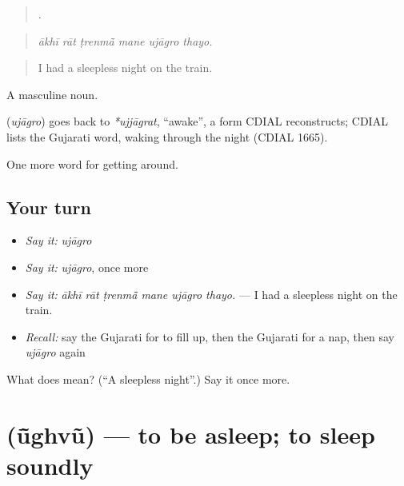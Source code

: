 \begin{quote}
     .
\end{quote}

\begin{quote}
\emph{ākhī rāt ṭrenmā̃ mane ujāgro thayo.}
\end{quote}

\begin{quote}
I had a sleepless night on the train.
\end{quote}

A masculine noun.

\begin{cousinweb}
\textbf{} (\emph{ujāgro}) goes back to \emph{*ujjāgrat}, \textquotedblleft{}awake\textquotedblright{}, a form CDIAL reconstructs; CDIAL lists the Gujarati word, waking through the night (CDIAL 1665).
\end{cousinweb}

\begin{grammarlens}[title={What you've built}]
One more word for getting around.
\end{grammarlens}

\subsection*{Your turn}
\begin{itemize}
\raggedright
  \item \emph{Say it:} \emph{ujāgro}
  \item \emph{Say it:} \emph{ujāgro}, once more
  \item \emph{Say it:} \emph{ākhī rāt ṭrenmā̃ mane ujāgro thayo.} — I had a sleepless night on the train.
  \item \emph{Recall:} say the Gujarati for to fill up, then the Gujarati for a nap, then say \emph{ujāgro} again
\end{itemize}

\begin{tcolorbox}[breakable,colback=teal!4,colframe=teal!35!black,title={Before you move on}]
What does  mean? (\textquotedblleft{}A sleepless night\textquotedblright{}.) Say it once more.
\end{tcolorbox}
\section[\texorpdfstring{\gu{ઊંઘવું} (ū̃ghvũ)}{ઊંઘવું (ū̃ghvũ)}]{ (ū̃ghvũ) — to be asleep; to sleep soundly}

